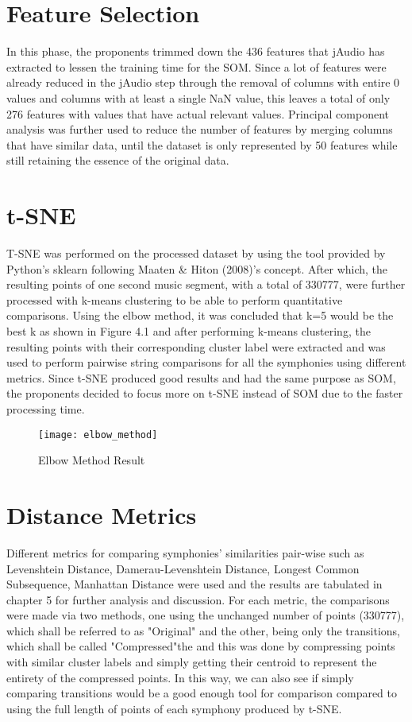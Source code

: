 \section{Feature Selection}
In this phase, the proponents trimmed down the 436 features that jAudio has extracted to lessen the training time for the SOM. Since a lot of features were already reduced in the jAudio step through the removal of columns with entire 0 values and columns with at least a single NaN value, this leaves a total of only 276 features with values that have actual relevant values. Principal component analysis was further used to reduce the number of features by merging columns that have similar data, until the dataset is only represented by 50 features while still retaining the essence of the original data.

\section{t-SNE}
T-SNE was performed on the processed dataset by using the tool provided by Python’s sklearn following Maaten \& Hiton (2008)’s concept. After which, the resulting points of one second music segment, with a total of 330777, were further processed with k-means clustering to be able to perform quantitative comparisons. Using the elbow method, it was concluded that k=5 would be the best k as shown in Figure 4.1 and after performing k-means clustering, the resulting points with their corresponding cluster label were extracted and was used to perform pairwise string comparisons for all the symphonies using different metrics. Since t-SNE produced good results and had the same purpose as SOM, the proponents decided to focus more on t-SNE instead of SOM due to the faster processing time.

\begin{figure}[h]
\caption{Elbow Method Result}
\centering
\texttt{[image: elbow\_method]}
\end{figure}

\section{Distance Metrics}
Different metrics for comparing symphonies’ similarities pair-wise such as Levenshtein Distance, Damerau-Levenshtein Distance, Longest Common Subsequence, Manhattan Distance were used and the results are tabulated in chapter 5 for further analysis and discussion. For each metric, the comparisons were made via two methods, one using the unchanged number of points (330777), which shall be referred to as "Original" and the other, being only the transitions, which shall be called "Compressed"the  and this was done by compressing points with similar cluster labels and simply getting their centroid to represent the entirety of the compressed points. In this way, we can also see if simply comparing transitions would be a good enough tool for comparison compared to using the full length of points of each symphony produced by t-SNE.


